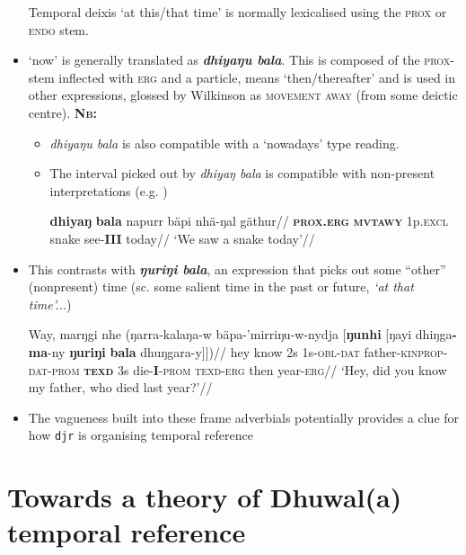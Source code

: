 \documentclass[11pt]{article}
\newcommand{\gls}{\textsc}
\begin{document}
\begin{itemize}
Temporal deixis `at this/that time' is normally lexicalised using the \textsc{prox} or \textsc{endo} stem.

\item `now' is generally translated as \textbf{\textit{dhiyaŋu bala}}. This is composed of the \textsc{prox-}stem inflected with \textsc{erg} and a particle, means `then/thereafter' and is used in other expressions, glossed by Wilkinson as \textsc{movement away} (from some deictic centre). \textbf{\textsc{Nb:}}

\begin{itemize}
	\item \textit{dhiyaŋu bala} is also compatible with a `nowadays' type reading.
	\item The interval picked out by \textit{dhiyaŋ bala} is compatible with non-present interpretations (e.g. \nextx)
	
	\pex\begingl\gla \textbf{dhiyaŋ} \textbf{bala} napurr bäpi nhä-ŋal gäthur//
	\glb \textbf{\gls{prox}.\gls{erg}} \textbf{\gls{mvtawy}} 1p.\gls{excl} snake see-\textbf{III} today//
	\glft`We saw a snake today'//\endgl\xe
	
	
\end{itemize}




\item This contrasts with \textbf{\textit{ŋuriŋi bala}}, an expression that picks out some ``other'' (nonpresent) time (sc. some salient time in the past or future, \textit{`at that time'...})


\pex\begingl\gla Way, marŋgi nhe (ŋarra-kalaŋa-w bäpa-'mirriŋu-w-nydja [\textbf{ŋunhi} [ŋayi dhiŋga\textbf{-ma}-ny \textbf{ŋuriŋi} \textbf{bala} dhuŋgara-y]])//
\glb hey know 2s 1s-\gls{obl}-\gls{dat} father-\gls{kinprop}-\gls{dat}-\gls{prom} \textbf{\gls{texd}} 3s die-\textbf{I}-\gls{prom} \gls{texd}-\gls{erg} then year-\gls{erg}//
\glft`Hey, did you know my father, who died last year?'//\endgl\xe


\item The vagueness built into these frame adverbials potentially provides a clue for how \texttt{djr} is organising temporal reference

\end{itemize}


\section*{Towards a theory of Dhuwal(a) temporal reference}
\end{document}
